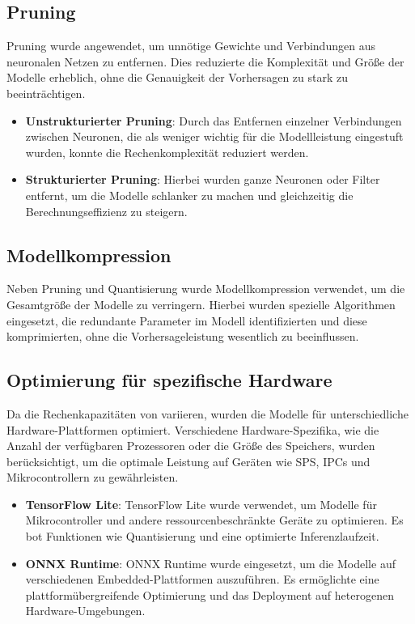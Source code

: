 \subsection{Pruning}
Pruning wurde angewendet, um unnötige Gewichte und Verbindungen aus neuronalen Netzen zu entfernen. Dies reduzierte die Komplexität und Größe der Modelle erheblich, 
ohne die Genauigkeit der Vorhersagen zu stark zu beeinträchtigen.

\begin{itemize}
    \item \textbf{Unstrukturierter Pruning}: Durch das Entfernen einzelner Verbindungen zwischen Neuronen, die als weniger wichtig für die Modellleistung eingestuft wurden, 
    konnte die Rechenkomplexität reduziert werden.
    \item \textbf{Strukturierter Pruning}: Hierbei wurden ganze Neuronen oder Filter entfernt, um die Modelle schlanker zu machen und gleichzeitig die Berechnungseffizienz 
    zu steigern.
\end{itemize}

\subsection{Modellkompression}
Neben Pruning und Quantisierung wurde Modellkompression verwendet, um die Gesamtgröße der Modelle zu verringern. Hierbei wurden spezielle Algorithmen eingesetzt, 
die redundante Parameter im Modell identifizierten und diese komprimierten, ohne die Vorhersageleistung wesentlich zu beeinflussen.

\subsection{Optimierung für spezifische Hardware}
Da die Rechenkapazitäten von \Emb variieren, wurden die Modelle für unterschiedliche Hardware-Plattformen optimiert. Verschiedene Hardware-Spezifika, 
wie die Anzahl der verfügbaren Prozessoren oder die Größe des Speichers, wurden berücksichtigt, um die optimale Leistung auf Geräten wie SPS, IPCs und Mikrocontrollern 
zu gewährleisten.

\begin{itemize}
    \item \textbf{TensorFlow Lite}: TensorFlow Lite wurde verwendet, um Modelle für Mikrocontroller und andere ressourcenbeschränkte Geräte zu optimieren. 
    Es bot Funktionen wie Quantisierung und eine optimierte Inferenzlaufzeit.
    \item \textbf{ONNX Runtime}: ONNX Runtime wurde eingesetzt, um die Modelle auf verschiedenen Embedded-Plattformen auszuführen. Es ermöglichte eine 
    plattformübergreifende Optimierung und das Deployment auf heterogenen Hardware-Umgebungen.
\end{itemize}

